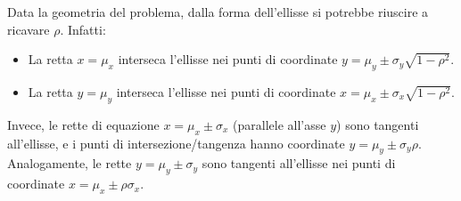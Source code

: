 \documentclass[openany,a4paper,12pt]{book}
\theoremstyle{remark}
\begin{document}
Data la geometria del problema, dalla forma dell'ellisse si potrebbe riuscire a ricavare $\rho$. Infatti:
\begin{itemize}
    \item La retta $x = \mu_x$ interseca l'ellisse nei punti di coordinate $y = \mu_y \pm \sigma_y\sqrt{1-\rho^2}$.
    \item La retta $y = \mu_y$ interseca l'ellisse nei punti di coordinate $x = \mu_x \pm \sigma_x\sqrt{1-\rho^2}$.
\end{itemize}

Invece, le rette di equazione $x = \mu_x \pm \sigma_x$ (parallele all'asse $y$) sono tangenti all'ellisse, e i punti di intersezione/tangenza hanno coordinate $y = \mu_y \pm \sigma_y\rho$.
Analogamente, le rette $y = \mu_y \pm \sigma_y$ sono tangenti all'ellisse nei punti di coordinate $x = \mu_x \pm \rho\sigma_x$.
\end{document}
